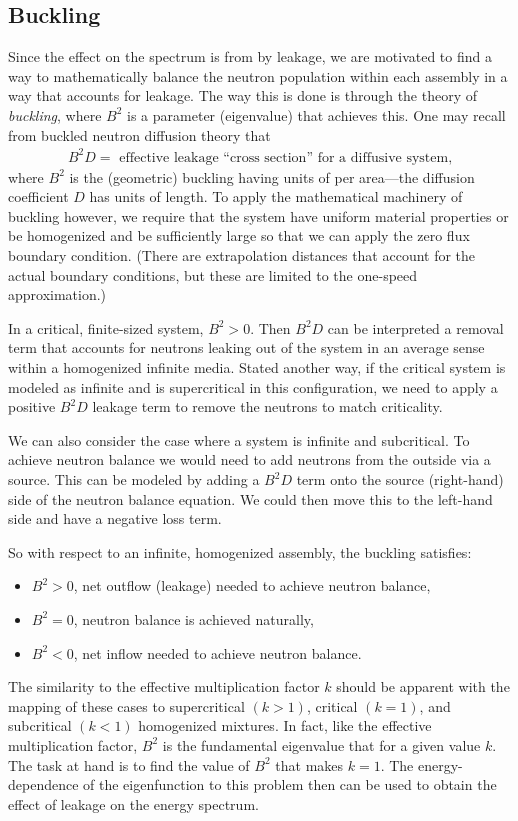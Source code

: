 \subsection{Buckling}

Since the effect on the spectrum is from by leakage, we are motivated to find a way to mathematically balance the neutron population within each assembly in a way that accounts for leakage. The way this is done is through the theory of \emph{buckling}, where $B^2$ is a parameter (eigenvalue) that achieves this. One may recall from buckled neutron diffusion theory that
\begin{align}
  B^2 D = \text{ effective leakage ``cross section'' for a diffusive system,} \nonumber
\end{align}
where $B^2$ is the (geometric) buckling having units of per area---the diffusion coefficient $D$ has units of length. To apply the mathematical machinery of buckling however, we require that the system have uniform material properties or be homogenized and be sufficiently large so that we can apply the zero flux boundary condition. (There are extrapolation distances that account for the actual boundary conditions, but these are limited to the one-speed approximation.)

In a critical, finite-sized system, $B^2 > 0$. Then $B^2 D$ can be interpreted a removal term that accounts for neutrons leaking out of the system in an average sense within a homogenized infinite media. Stated another way, if the critical system is modeled as infinite and is supercritical in this configuration, we need to apply a positive $B^2 D$ leakage term to remove the neutrons to match criticality. 

We can also consider the case where a system is infinite and subcritical. To achieve neutron balance we would need to add neutrons from the outside via a source. This can be modeled by adding a $B^2 D$ term onto the source (right-hand) side of the neutron balance equation. We could then move this to the left-hand side and have a negative loss term.

So with respect to an infinite, homogenized assembly, the buckling satisfies:
\begin{itemize}
  \item $B^2 > 0$, \quad net outflow (leakage) needed to achieve neutron balance,
  \item $B^2 = 0$, \quad neutron balance is achieved naturally, 
  \item $B^2 < 0$, \quad net inflow needed to achieve neutron balance.
\end{itemize}
The similarity to the effective multiplication factor $k$ should be apparent with the mapping of these cases to supercritical $(k > 1)$, critical $(k = 1)$, and subcritical $(k < 1)$ homogenized mixtures. In fact, like the effective multiplication factor, $B^2$ is the fundamental eigenvalue that for a given value $k$. The task at hand is to find the value of $B^2$ that makes $k = 1$. The energy-dependence of the eigenfunction to this problem then can be used to obtain the effect of leakage on the energy spectrum.

